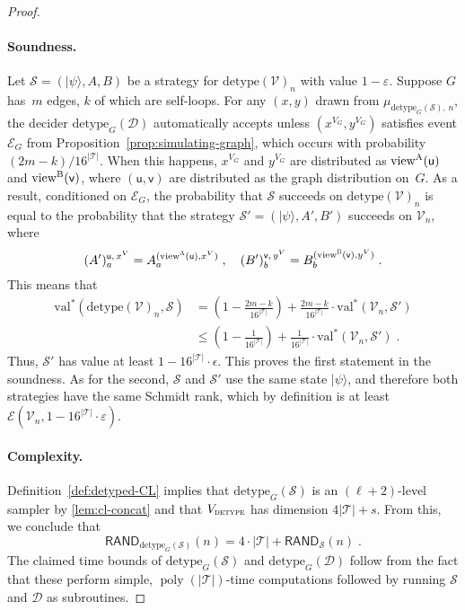 \documentclass[11pt]{article}
\theoremstyle{definition}
\newcommand{\ket}[1]{|#1\rangle}
\DeclareMathOperator{\poly}{poly}
\newcommand{\val}{\ensuremath{\mathrm{val}}}
\newcommand{\eps}{\varepsilon}
\newcommand{\sampler}{\mathcal{S}}
\newcommand{\decider}{\mathcal{D}}
\newcommand{\verifier}{\mathcal{V}}
\newcommand{\strategy}{\mathscr{S}}
\newcommand{\detype}{\mathrm{detype}}
\newcommand{\type}{\mathcal{T}}
\newcommand{\gamestyle}[1]{\ensuremath{\textsc{#1}}\xspace}
\newcommand{\labelstyle}[1]{\ensuremath{\textsc{#1}}\xspace}
\newcommand{\tvarstyle}[1]{\mathsf{#1}}
\newcommand{\lvar}{\ensuremath{\tvarstyle{u}}}
\newcommand{\rvar}{\ensuremath{\tvarstyle{v}}}
\newcommand{\alice}{\labelstyle{A}}
\newcommand{\bob}{\labelstyle{B}}
\newcommand{\Ent}{\mathscr{E}}
\newcommand{\RAND}{\mathsf{RAND}}
\begin{document}
\begin{proof}
\paragraph{Soundness.}
Let $\strategy = (\ket{\psi}, A, B)$ be a strategy for $\detype(\verifier)_n$
with value $1-\eps$.
Suppose $G$ has~$m$ edges, $k$ of which are self-loops.
For any $(x, y)$ drawn from $\mu_{\detype_G(\sampler),\, n}$, the decider
$\detype_G(\decider)$ automatically accepts unless $(x^{V_G},y^{V_G})$ satisfies
event $\mathcal{E}_G$ from Proposition~\ref{prop:simulating-graph}, which occurs
with probability $(2m-k)/16^{|\type|}$.
When this happens, $x^{V_G}$ and $y^{V_G}$ are distributed as
$\mathrm{view}^\alice(\lvar)$ and $\mathrm{view}^\bob(\rvar)$, where $(\lvar,
\rvar)$ are distributed as the graph distribution on~$G$.
As a result, conditioned on $\mathcal{E}_G$, the probability that $\strategy$
succeeds on $\detype(\verifier)_n$ is equal to the probability that the strategy
$\strategy' = (\ket{\psi}, A', B')$ succeeds on $\verifier_n$, where
\begin{equation*}
  (A')^{\lvar,\, x^V}_a = A^{(\mathrm{view}^\alice(\lvar), x^V)}_a\;, \quad
  (B')^{\rvar,\, y^V}_b = B^{(\mathrm{view}^\bob(\rvar), y^V)}_b\;.
\end{equation*}
This means that
\begin{align*}
  \val^*(\detype(\verifier)_n, \strategy)
  & = \left(1 - \frac{2m-k}{16^{|\type|}}\right) +
    \frac{2m-k}{16^{|\type|}} \cdot \val^*(\verifier_n, \strategy')\\
  & \leq \left(1 - \frac{1}{16^{|\type|}}\right) +
    \frac{1}{16^{|\type|}} \cdot \val^*(\verifier_n, \strategy')\;.
\end{align*}
Thus, $\strategy'$ has value at least $1-16^{|\type|} \cdot \epsilon$.
This proves the first statement in the soundness.
As for the second, $\strategy$ and $\strategy'$ use the same state $\ket{\psi}$,
and therefore both strategies have the same Schmidt rank, which by definition is
at least $\Ent(\verifier_n,1 - 16^{|\type|} \cdot\eps)$.

\paragraph{Complexity.}
Definition~\ref{def:detyped-CL} implies that $\detype_G(\sampler)$ is an
$(\ell+2)$-level sampler by \cref{lem:cl-concat} and that
$V_{\gamestyle{detype}}$ has dimension $4|\type| + s$.
From this, we conclude that
\begin{equation*}
  \RAND_{\detype_G(\sampler)}(n) = 4\cdot |\type|+ \RAND_\sampler(n)\;.
\end{equation*}
The claimed time bounds of $\detype_G(\sampler)$ and $\detype_G(\decider)$
follow from the fact that these perform simple, $\poly(|\type|)$-time
computations followed by running $\sampler$ and $\decider$ as subroutines.
\end{proof}
\end{document}
